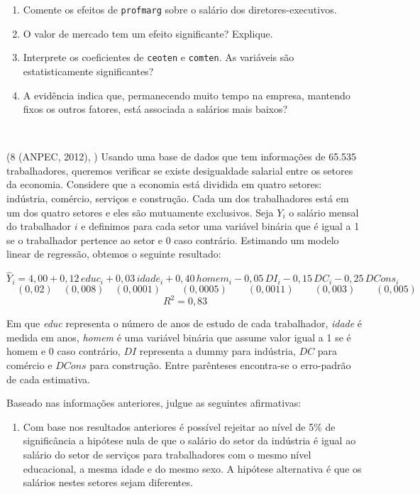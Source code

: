 \documentclass[12pt,letterpaper, onecolumn]{exam}
\begin{document}
\begin{questions}
\begin{enumerate}[label=(\roman*)]
    \item Comente os efeitos de \texttt{profmarg} sobre o salário dos diretores-executivos.
    \item O valor de mercado tem um efeito significante? Explique.
    \item Interprete os coeficientes de \texttt{ceoten} e \texttt{comten}. As variáveis são estatisticamente significantes?
    \item A evidência indica que, permanecendo muito tempo na empresa, mantendo fixos os outros fatores, está associada a salários mais baixos?
\end{enumerate}

    \
\
\


\question (8 (ANPEC, 2012), \citep{pereda_denisard}) Usando uma base de dados que tem informações de 65.535 trabalhadores, queremos verificar se existe desigualdade salarial entre os setores da economia. Considere que a economia está dividida em quatro setores: indústria, comércio, serviços e construção. Cada um dos trabalhadores está em um dos quatro setores e eles são mutuamente exclusivos. Seja \(Y_i\) o salário mensal do trabalhador \(i\) e definimos para cada setor uma variável binária que é igual a 1 se o trabalhador pertence ao setor e 0 caso contrário. Estimando um modelo linear de regressão, obtemos o seguinte resultado:

\[
\hat{Y}_i = 4{,}00 + 0{,}12\,educ_i + 0{,}03\,idade_i + 0{,}40\,homem_i - 0{,}05\,DI_i - 0{,}15\,DC_i - 0{,}25\,DCons_i
\] 
\vspace{-0.8cm}
\[
\quad (0{,}02)\quad (0{,}008)\quad (0{,}0001)\qquad (0{,}0005)\qquad (0{,}0011)\qquad (0{,}003)\qquad (0{,}005)
\]
\[
R^2 = 0{,}83
\]

Em que \textit{educ} representa o número de anos de estudo de cada trabalhador, \textit{idade} é medida em anos, \textit{homem} é uma variável binária que assume valor igual a 1 se é homem e 0 caso contrário, \(DI\) representa a dummy para indústria, \(DC\) para comércio e \(DCons\) para construção. Entre parênteses encontra-se o erro-padrão de cada estimativa.

Baseado nas informações anteriores, julgue as seguintes afirmativas:

\begin{enumerate}[label=(\arabic*)]
    \item Com base nos resultados anteriores é possível rejeitar ao nível de 5\% de significância a hipótese nula de que o salário do setor da indústria é igual ao salário do setor de serviços para trabalhadores com o mesmo nível educacional, a mesma idade e do mesmo sexo. A hipótese alternativa é que os salários nestes setores sejam diferentes.
    

\end{enumerate}
\end{questions}
\end{document}

